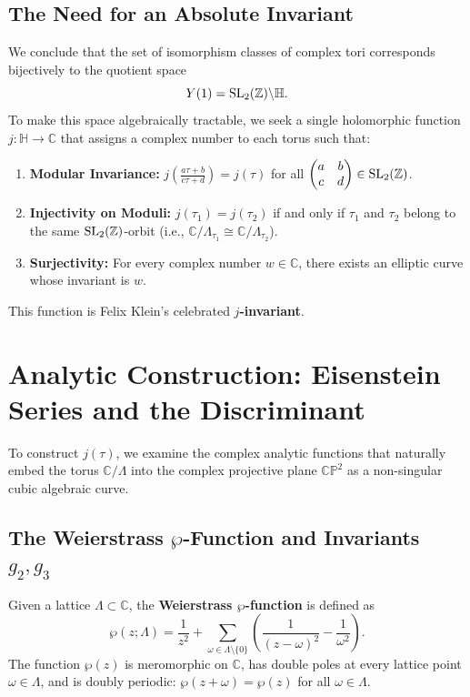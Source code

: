 \documentclass[a4paper]{article}
\begin{document}
\subsection{The Need for an Absolute Invariant}
We conclude that the set of isomorphism classes of complex tori corresponds bijectively to the quotient space
\begin{equation}
 Y(1) = \mathrm{SL}_2(\mathbb{Z}) \backslash \mathbb{H}.
\end{equation}
To make this space algebraically tractable, we seek a single holomorphic function $j: \mathbb{H} \to \mathbb{C}$ that assigns a complex number to each torus such that:
\begin{enumerate}[label=(\roman*)]
 \item \textbf{Modular Invariance:} $j\left(\frac{a\tau + b}{c\tau + d}\right) = j(\tau)$ for all $\begin{pmatrix} a & b \\ c & d \end{pmatrix} \in \mathrm{SL}_2(\mathbb{Z})$.
 \item \textbf{Injectivity on Moduli:} $j(\tau_1) = j(\tau_2)$ if and only if $\tau_1$ and $\tau_2$ belong to the same $\mathrm{SL}_2(\mathbb{Z})$-orbit (i.e., $\mathbb{C}/\Lambda_{\tau_1} \cong \mathbb{C}/\Lambda_{\tau_2}$).
 \item \textbf{Surjectivity:} For every complex number $w \in \mathbb{C}$, there exists an elliptic curve whose invariant is $w$.
\end{enumerate}
This function is Felix Klein's celebrated \textbf{$j$-invariant}.

\section{Analytic Construction: Eisenstein Series and the Discriminant}
\label{sec:analytic_construction}

To construct $j(\tau)$, we examine the complex analytic functions that naturally embed the torus $\mathbb{C}/\Lambda$ into the complex projective plane $\mathbb{C}\mathbb{P}^2$ as a non-singular cubic algebraic curve.

\subsection{The Weierstrass \texorpdfstring{$\wp$}{P}-Function and Invariants \texorpdfstring{$g_2, g_3$}{g2, g3}}
Given a lattice $\Lambda \subset \mathbb{C}$, the \textbf{Weierstrass $\wp$-function} is defined as
\begin{equation}
 \wp(z; \Lambda) = \frac{1}{z^2} + \sum_{\omega \in \Lambda \setminus \{0\}} \left( \frac{1}{(z - \omega)^2} - \frac{1}{\omega^2} \right).
\end{equation}
The function $\wp(z)$ is meromorphic on $\mathbb{C}$, has double poles at every lattice point $\omega \in \Lambda$, and is doubly periodic: $\wp(z + \omega) = \wp(z)$ for all $\omega \in \Lambda$.
\end{document}
